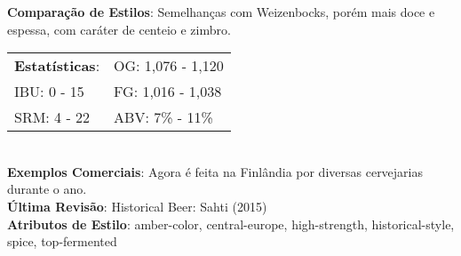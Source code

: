 \textbf{Comparação de Estilos}: Semelhanças com Weizenbocks, porém mais doce e espessa, com caráter de centeio e zimbro. \\
\begin{tabular}{@{}p{35mm}p{35mm}@{}}
  \textbf{Estatísticas}: & OG: 1,076 - 1,120 \\
  IBU: 0 - 15  & FG: 1,016 - 1,038  \\
  SRM: 4 - 22 & ABV: 7\% - 11\%
\end{tabular}\\
\textbf{Exemplos Comerciais}: Agora é feita na Finlândia por diversas cervejarias durante o ano. \\
\textbf{Última Revisão}: Historical Beer: Sahti (2015) \\
\textbf{Atributos de Estilo}: amber-color, central-europe, high-strength, historical-style, spice, top-fermented